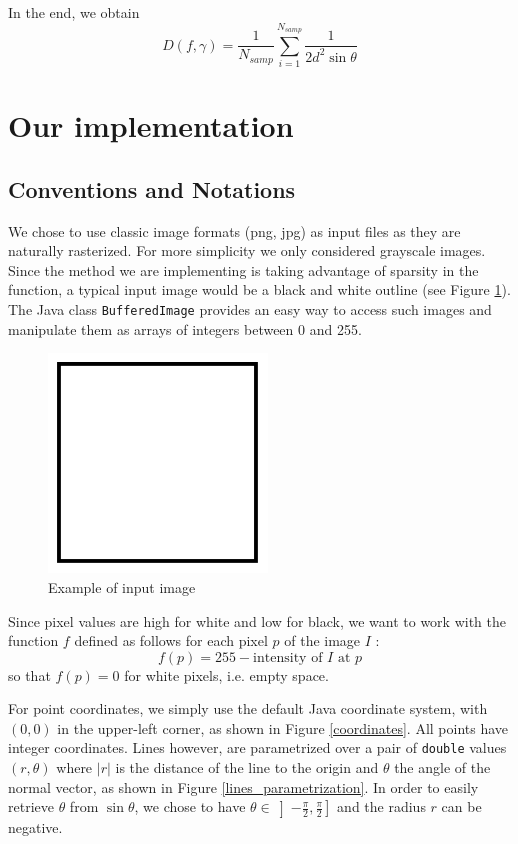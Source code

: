 \documentclass[10pt,a4paper]{article}			%
\begin{document}
In the end, we obtain $$D(f,\gamma) = \frac{1}{N_{samp}} \sum_{i=1}^{N_{samp}}\frac{1}{2d^2\sin\theta}$$


	
	\section{Our implementation}

	\subsection {Conventions and Notations}
We chose to use classic image formats (png, jpg) as input files as they are naturally rasterized. For more simplicity we only considered grayscale images. Since the method we are implementing is taking advantage of sparsity in the function, a typical input image would be a black and white outline (see Figure \ref{exemple_carre}). The Java class \texttt{BufferedImage} provides an easy way to access such images and manipulate them as arrays of integers between 0 and 255. 
\begin{figure}[h]
\begin{center}
\includegraphics[scale=0.5]{img/carre.png}
\caption{Example of input image}
\label{exemple_carre}
\end{center}
\end{figure}

Since pixel values are high for white and low for black, we want to work with the function $f$ defined as follows for each pixel $p$ of the image $I$ :
\[f(p) = 255 - \text{intensity of $I$ at $p$}\]
so that $f(p)=0$ for white pixels, i.e. empty space.

For point coordinates, we simply use the default Java coordinate system, with $(0,0)$ in the upper-left corner, as shown in Figure \ref{coordinates}. All points have integer coordinates. Lines however, are parametrized over a pair of \texttt{double} values $(r,\theta)$ where $|r|$ is the distance of the line to the origin and $\theta$ the angle of the normal vector, as shown in Figure \ref{lines_parametrization}. In order to easily retrieve $\theta$ from $\sin\theta$, we chose to have $\theta\in\left]-\frac{\pi}{2},\frac{\pi}{2}\right]$ and the radius $r$ can be negative.
\end{document}
